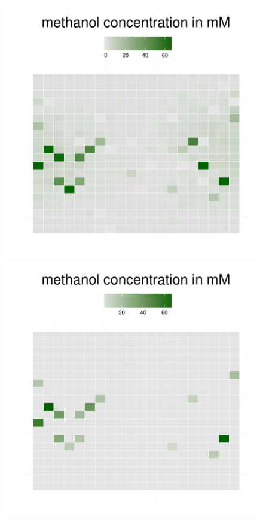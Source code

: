 \begin{figure}[h]
{\begin{minipage}[t]{0.3\textwidth}
  \end{minipage}
  \begin{minipage}[t]{0.3\textwidth}
    \includegraphics[width=\textwidth]{../results/barkeri_20x20_seed9659_methanol100.pdf}
  \end{minipage}
  \begin{minipage}[t]{0.3\textwidth}
    \includegraphics[width=\textwidth]{../results/barkeri_20x20_seed9659_methanol130.pdf}

\end{minipage}}
\end{figure}
